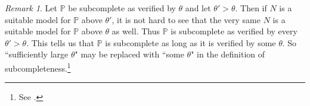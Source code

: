 \documentclass{amsart}
\theoremstyle{definition}
\newtheorem{definition}[theorem]{Definition}
\theoremstyle{remark}
\newtheorem{remark}[theorem]{Remark}
\renewcommand{\P}{\mathbb{P}}
\newcommand{\N}{{\overline{N}}}
\newcommand{\G}{\overline{G}}
\newcommand{\ZFC}{\textup{\ensuremath{\textsf{ZFC}}}}
\DeclareMathOperator{\ran}{range}
\newcommand{\SH}{\mathcal{H}\textit{ull} \,}
\newcommand{\sk}[3]{\SH^{#1}( {#2} \cup {\ran(#3)} ) }
\newcommand{\Sk}[3]{\SH^{#1}( {#2} \cup {#3} ) }
\begin{document}
%
%
%

\begin{remark}\label{remark:VerifyingSC}Let $\P$ be subcomplete as verified by $\theta$ and let $\theta'>\theta$. Then if $N$ is a suitable model for $\P$ above $\theta'$, it is not hard to see that the very same $N$ is a suitable model for $\P$ above $\theta$ as well. Thus $\P$ is subcomplete as verified by every $\theta' > \theta$. This tells us that $\P$ is subcomplete as long as it is verified by some $\theta$. So ``sufficiently large $\theta$" may be replaced with ``some $\theta$" in the definition of subcompleteness.\footnote{See \cite[Section 3.1 Lemma 2.4]{Jensen:2014}.} \end{remark}
\end{document}
